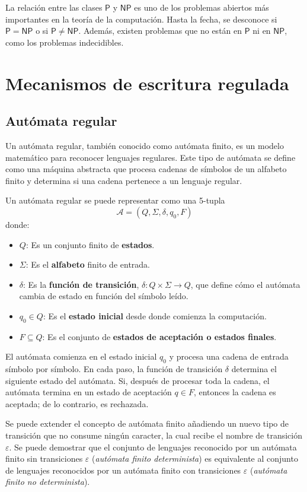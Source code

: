 \documentclass{article}
\begin{document}
La relación entre las clases $\mathsf{P}$ y $\mathsf{NP}$ es uno de los problemas abiertos más importantes en la teoría de la computación. Hasta la fecha, se desconoce si $\mathsf{P} = \mathsf{NP}$ o si $\mathsf{P} \neq \mathsf{NP}$. Además, existen problemas que no están en $\mathsf{P}$ ni en $\mathsf{NP}$, como los problemas indecidibles.

\section{Mecanismos de escritura regulada}

\subsection{Autómata regular}

Un autómata regular, también conocido como autómata finito, es un modelo matemático para reconocer lenguajes regulares. Este tipo de autómata se define como una máquina abstracta que procesa cadenas de símbolos de un alfabeto finito y determina si una cadena pertenece a un lenguaje regular.

Un autómata regular se puede representar como una 5-tupla $$\mathcal{A} = (Q, \Sigma, \delta, q_0, F)$$ donde:

\begin{itemize}
      \item $Q$: Es un conjunto finito de \textbf{estados}.
      \item $\Sigma$: Es el \textbf{alfabeto} finito de entrada.
      \item $\delta$: Es la \textbf{función de transición}, $\delta: Q \times \Sigma \to Q$, que define cómo el autómata cambia de estado en función del símbolo leído.
      \item $q_0 \in Q$: Es el \textbf{estado inicial} desde donde comienza la computación.
      \item $F \subseteq Q$: Es el conjunto de \textbf{estados de aceptación o estados finales}.
\end{itemize}

El autómata comienza en el estado inicial $q_0$ y procesa una cadena de entrada símbolo por símbolo. En cada paso, la función de transición $\delta$ determina el siguiente estado del autómata. Si, después de procesar toda la cadena, el autómata termina en un estado de aceptación $q \in F$, entonces la cadena es aceptada; de lo contrario, es rechazada.

Se puede extender el concepto de autómata finito añadiendo un nuevo tipo de transición que no consume ningún caracter, la cual recibe el nombre de transición $\varepsilon$.
Se puede demostrar que el conjunto de lenguajes reconocido por un autómata finito sin transiciones $\varepsilon$ (\textit{autómata finito determinista}) es equivalente al conjunto de lenguajes reconocidos por un autómata finito con transiciones $\varepsilon$ (\textit{autómata finito no determinista}).
\end{document}
